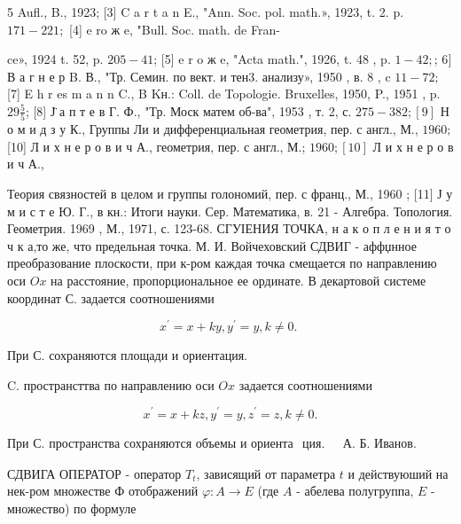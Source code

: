 \documentclass[10pt]{article}
\begin{document}
5 Aufl., B., 1923; [3] C a r t a n E., "Ann. Soc. pol. math.», 1923, t. 2. p. $171-221 ;$ [4] e ro ж e, "Bull. Soc. math. de Fran-

ce», 1924 t. 52, p. $205-41$; [5] e r o ж e, "Acta math.", 1926, t. 48 , p. $1-42 ;$; 6$]$ В а г н е р B. В., "Тр. Семин. по вект. и тен3. анализу», 1950 , в. 8 , c $11-72 ;$ [7] E h r es m a n n C., B Kн.: Coll. de Topologie. Bruxelles, 1950, P., 1951 , p. $29 \frac{5}{5}$; [8] Ј̈ а п т е в Г. Ф., "Тр. Моск матем об-ва", 1953 , т. 2, с. $275-382 ;[9]$ Н о м и д з у К., Группы Ли и дифференциальная геометрия, пер. с англ., М., $1960 ;$ [10] Л и х н е р о в и ч А., геометрия, пер. с англ., М.; $1960 ;[10]$ Л и х н е р о в и ч А.,

Теория связностей в целом и группы голономий, пер. с франц., М., 1960 ; [11] Ј у м и с т е Ю. Г., в кн.: Итоги науки. Сер. Математика, в. 21 - Алгебра. Топология. Геометрия. 1969 , М., 1971, с. 123-68. СГУІЕНИЯ ТОЧКА, н а к о п л е н и я т о ч к а,то же, что предельная точка. М. И. Войчеховский СДВИГ - аффџнное преобразование плоскости, при к-ром каждая точка смещается по направлению оси $O x$ на расстояние, пропорциональное ее ординате. В декартовой системе координат С. задается соотношениями



\[

x^{\prime}=x+k y, y^{\prime}=y, k \neq 0 \text {. }

\]



При С. сохраняются площади и ориентация.



C. пространсттва по направлению оси $O x$ задается соотношениями



\[

x^{\prime}=x+k z, y^{\prime}=y, z^{\prime}=z, k \neq 0 .

\]



При С. пространства сохраняются объемы и ориента$\begin{array}{ll}\text { ция. } & \text { А. Б. Иванов. }\end{array}$



СДВИГА ОПЕРАТОР - оператор $T_{t}$, зависящий от параметра $t$ и действуюший на нек-ром множестве Ф отображений $\varphi: A \rightarrow E$ (где $A$ - абелева полугруппа, $E$ - множество) по формуле
\end{document}
